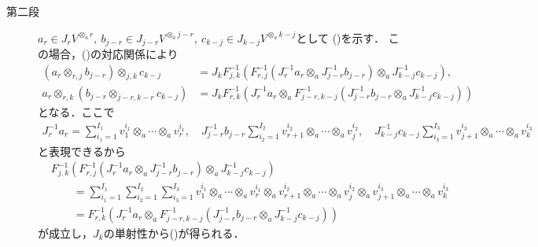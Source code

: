 \begin{prf}
\begin{description}
			\item[第二段]
				$a_r \in J_r V^{\otimes_a r},\ b_{j-r} \in J_{j-r} V^{\otimes_a j-r},
				\ c_{k-j} \in J_{k-j} V^{\otimes_a k-j}$として
				()を示す．
				この場合，()の対応関係により
				\begin{align}
					\left( a_r \otimes_{r,j} b_{j-r} \right) \otimes_{j,k} c_{k-j}
					&= J_k F_{j,k}^{-1}\left( F_{r,j}^{-1} \left( J_r^{-1}a_r \otimes_a J_{j-r}^{-1} b_{j-r} \right) \otimes_a J_{k-j}^{-1} c_{k-j} \right), \\
					a_r \otimes_{r,k} \left( b_{j-r} \otimes_{j-r,k-r} c_{k-j} \right)
					&= J_k F_{r,k}^{-1}\left( J_r^{-1}a_r \otimes_a F_{j-r,k-j}^{-1} \left( J_{j-r}^{-1} b_{j-r} \otimes_a J_{k-j}^{-1} c_{k-j} \right) \right)
				\end{align}
				となる．ここで
				\begin{align}
					J_r^{-1} a_r = \sum_{i_1 = 1}^{I_1} v_1^{i_1} \otimes_a \cdots \otimes_a v_r^{i_1},
					\quad J_{j-r}^{-1} b_{j-r} \sum_{i_2 = 1}^{I_2} v_{r+1}^{i_2} \otimes_a \cdots \otimes_a v_j^{i_2},
					\quad J_{k-j}^{-1} c_{k-j} \sum_{i_3 = 1}^{I_3} v_{j+1}^{i_3} \otimes_a \cdots \otimes_a v_k^{i_3}
				\end{align}
				と表現できるから
				\begin{align}
					&F_{j,k}^{-1}\left( F_{r,j}^{-1} \left( J_r^{-1}a_r \otimes_a J_{j-r}^{-1} b_{j-r} \right) \otimes_a J_{k-j}^{-1} c_{k-j} \right) \\
					&\qquad = \sum_{i_1=1}^{I_1}\sum_{i_2=1}^{I_2}\sum_{i_3=1}^{I_3} 
						v_1^{i_1} \otimes_a \cdots \otimes_a v_r^{i_1}
						\otimes_a v_{r+1}^{i_2} \otimes_a \cdots \otimes_a v_j^{i_2}
						\otimes_a v_{j+1}^{i_3} \otimes_a \cdots \otimes_a v_k^{i_3} \\
					&\qquad = 	F_{r,k}^{-1}\left( J_r^{-1}a_r \otimes_a F_{j-r,k-j}^{-1} \left( J_{j-r}^{-1} b_{j-r} \otimes_a J_{k-j}^{-1} c_{k-j} \right) \right)
				\end{align}
				が成立し，$J_k$の単射性から()が得られる．
			

\end{description}
\end{prf}
